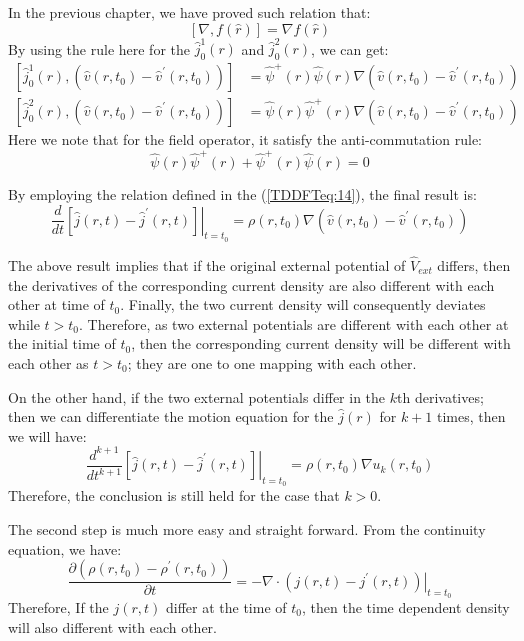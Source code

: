 In the previous chapter, we have proved such relation that:
\begin{equation}\label{}
[\nabla, f(\hat{r})] = \nabla f(\hat{r})
\end{equation}
By using the rule here for the $\hat{j}_{0}^{1}(r)$ and
$\hat{j}_{0}^{2}(r)$, we can get:
\begin{align}\label{key_step_RG_theorem}
[\hat{j}_{0}^{1}(r),(\hat{v}(r, t_{0})-\hat{v}^{'}(r, t_{0}))]
&=\hat{\psi}^{+}(r)\hat{\psi}(r)\nabla(\hat{v}(r,
t_{0})-\hat{v}^{'}(r, t_{0})) \nonumber \\
[\hat{j}_{0}^{2}(r),(\hat{v}(r, t_{0})-\hat{v}^{'}(r, t_{0}))]
&=\hat{\psi}(r)\hat{\psi}^{+}(r)\nabla(\hat{v}(r,
t_{0})-\hat{v}^{'}(r, t_{0}))
\end{align}
Here we note that for the field operator, it satisfy the
anti-commutation rule:
\begin{equation}\label{}
\hat{\psi}(r)\hat{\psi}^{+}(r) + \hat{\psi}^{+}(r)\hat{\psi}(r) = 0
\end{equation}

By employing the relation defined in the (\ref{TDDFTeq:14}), the
final result is:
\begin{equation}\label{TDDFTeq:6}
\frac{d}{dt}\left.[\hat{j}(r,t)-\hat{j}^{'}(r,t)]\right|_{t=t_{0}}
=\rho(r,t_{0})\nabla(\hat{v}(r, t_{0})-\hat{v}^{'}(r, t_{0}))
\end{equation}

The above result implies that if the original external potential of
$\hat{V}_{ext}$ differs, then the derivatives of the corresponding
current density are also different with each other at time of
$t_{0}$. Finally, the two current density will consequently deviates
while $t > t_{0}$. Therefore, as two external potentials are
different with each other at the initial time of $t_{0}$, then the
corresponding current density will be different with each other as
$t> t_{0}$; they are one to one mapping with each other.

On the other hand, if the two external potentials differ in the
$k$th derivatives; then we can differentiate the motion equation for
the $\hat{j}(r)$ for $k+1$ times, then we will have:
\begin{equation}\label{TDDFTeq:7}
\frac{d^{k+1}}{dt^{k+1}}\left.[\hat{j}(r,t)-\hat{j}^{'}(r,t)]
\right|_{t=t_{0}} = \rho(r,t_{0})\nabla u_{k}(r,t_{0})
\end{equation}
Therefore, the conclusion is still held for the case that $k>0$.

The second step is much more easy and straight forward. From the
continuity equation, we have:
\begin{equation}\label{}
\frac{\partial(\rho(r,t_{0}) - \rho^{'}(r,t_{0}))}{\partial t} =-
\left.\nabla\cdot (j(r,t)-j^{'}(r,t))\right|_{t=t_{0}}
\end{equation}
Therefore, If the $j(r,t)$ differ at the time of $t_{0}$, then the
time dependent density will also different with each other.

